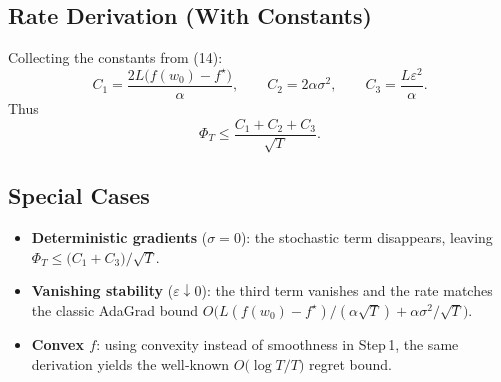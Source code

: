 \documentclass{article}
\begin{document}
\subsection*{Rate Derivation (With Constants)}
Collecting the constants from (14):
\[
C_{1}= \frac{2L\bigl(f(w_{0})-f^{\star}\bigr)}{\alpha},\qquad
C_{2}= 2\alpha\sigma^{2},\qquad
C_{3}= \frac{L\varepsilon^{2}}{\alpha}.
\]
Thus
\[
\Phi_{T}\le\frac{C_{1}+C_{2}+C_{3}}{\sqrt{T}}.
\]

\subsection*{Special Cases}
\begin{itemize}
\item \textbf{Deterministic gradients} ($\sigma=0$): the stochastic term disappears,
  leaving $\Phi_{T}\le\bigl(C_{1}+C_{3}\bigr)/\sqrt{T}$.
\item \textbf{Vanishing stability} ($\varepsilon\downarrow0$): the third term
  vanishes and the rate matches the classic AdaGrad bound
  $O\bigl(L(f(w_{0})-f^{\star})/(\alpha\sqrt{T})+ \alpha\sigma^{2}/\sqrt{T}\bigr)$.
\item \textbf{Convex $f$}: using convexity instead of smoothness in Step 1,
  the same derivation yields the well‑known $O\bigl(\log T/T\bigr)$ regret bound.
\end{itemize}
\end{document}
